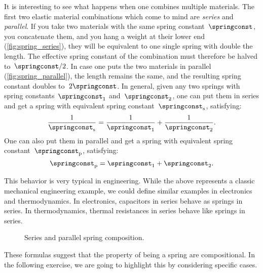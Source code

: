 It is interesting to see what happens when one combines multiple materials. The first two elastic material combinations which come to mind are \emph{series} and \emph{parallel}.
If you take two materials with the same spring constant~$\springconst$, you concatenate them, and you hang a weight at their lower end (\cref{fig:spring_series}), they will be equivalent to one single spring with double the length.
The effective spring constant of the combination must therefore be halved to~$\springconst/2$.
In case one puts the two materials in parallel (\cref{fig:spring_parallel}), the length remains the same, and the resulting spring constant doubles to~$2\springconst$.
In general, given any two springs with spring constants~$\springconst_1$ and~$\springconst_2$, one can put them in series and get a spring with equivalent spring constant~$\springconst_{\mathrm{s}}$, satisfying:
\begin{equation*}
  \frac{1}{\springconst_\mathrm{s}}=\frac{1}{\springconst_1}+\frac{1}{\springconst_2}.
\end{equation*}
One can also put them in parallel and get a spring with equivalent spring constant~$\springconst_\mathrm{p}$, satisfying:
\begin{equation*}
  \springconst_\mathrm{p}=\springconst_1+\springconst_2.
\end{equation*}

\begin{remark}
  This behavior is very typical in engineering. While the above represents a classic mechanical engineering example, we could define similar examples in electronics and thermodynamics. In electronics, capacitors in series behave as springs in series.
  In thermodynamics, thermal resistances in series behave like springs in series.
\end{remark}

\begin{figure}[h]
  \begin{center}
  \hspace{1cm}
\end{center}
  \caption{Series and parallel spring composition.}
\end{figure}

These formulas suggest that the property of being a spring are compositional. In the following exercise, we are going to highlight this by considering specific cases.

